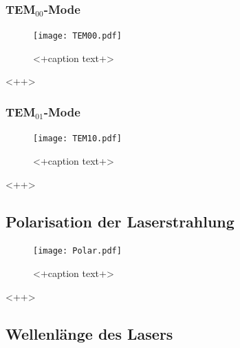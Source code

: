 \subsubsection{TEM$_\text{00}$-Mode}
\begin{figure}
  \centering
  \texttt{[image: TEM00.pdf]}
  \caption{<+caption text+>}
  \label{fig:<+label+>}
\end{figure}<++>
\subsubsection{TEM$_\text{01}$-Mode}
\begin{figure}
  \centering
  \texttt{[image: TEM10.pdf]}
  \caption{<+caption text+>}
  \label{fig:<+label+>}
\end{figure}<++>

\subsection{Polarisation der Laserstrahlung}

\begin{figure}
  \centering
  \texttt{[image: Polar.pdf]}
  \caption{<+caption text+>}
  \label{fig:<+label+>}
\end{figure}<++>
\subsection{Wellenlänge des Lasers}

